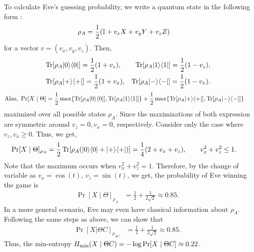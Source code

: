 To calculate Eve's guessing probability, we write a quantum state in the following form \cite{wilde2013quantum,nielsen2002quantum}:
\begin{align*}
    \rho_{A} 
    &= \frac{1}{2} (\mathbb{I} + v_{x} X + v_{y} Y + v_{z} Z)
\end{align*}
for a vector $v = (v_{x}, v_{y}, v_{z})$. Then,
\begin{align*}
    &\operatorname{Tr}[\rho_{A} |0 \rangle \langle 0|] 
    = \frac{1}{2} (1 + v_{z}), 
    &\operatorname{Tr}[\rho_{A} |1 \rangle \langle 1|] 
    = \frac{1}{2} (1 - v_{z}), \\
    &\operatorname{Tr}[\rho_{A} |+ \rangle \langle +|] 
    = \frac{1}{2} (1 + v_{x}), 
    &\operatorname{Tr}[\rho_{A} |- \rangle \langle -|] 
    = \frac{1}{2} (1 - v_{x}). 
\end{align*}
\begin{align*}
    \text{Also, } \Pr[X \mid \Theta] 
    &= \frac{1}{2} \max\{\operatorname{Tr}[\rho_{A} |0 \rangle \langle 0|], \operatorname{Tr}[\rho_{A} |1 \rangle \langle 1|]\} + 
    \frac{1}{2} \max\{\operatorname{Tr}[\rho_{A} |+ \rangle \langle +|], \operatorname{Tr}[\rho_{A} |- \rangle \langle -|]\}
\end{align*}
maximized over all possible states $\rho_{A}$. Since the maximizations of both expression are symmetric around $v_{z} = 0, v_{x} = 0$, respectively.  Consider only the case where $v_{z}, v_{x} \ge 0$. Thus, we get,
\begin{align*}
    \Pr[X \mid \Theta]_{\rho_{A}} 
    &= \frac{1}{2} \operatorname{Tr}[\rho_{A} (|0 \rangle \langle 0| + |+ \rangle \langle +|)] = \frac{1}{4} (2 + v_{x} + v_{z}), \qquad v_{x}^{2} + v_{z}^{2} \le 1.
\end{align*}
Note that the maximum occurs when $v_{x}^{2} + v_{z}^{2} = 1$. 
Therefore, by the change of variable as  $v_{x} = \cos(t)$, $v_{z} = \sin(t)$, we get,  the probability of Eve winning the game is 
\begin{align*}
    \Pr[X \mid \Theta]_{\rho_{A}} 
    &= \frac{1}{2} + \frac{1}{2 \sqrt{2}} 
    \approx 0.85.
\end{align*}
In a more general scenario, Eve may even have classical information about $\rho_{A}$. Following the same steps as above, we can show that 
\begin{align*}
    \Pr[X | \Theta C]_{\rho_{AC}} 
    &= \frac{1}{2} + \frac{1}{2 \sqrt{2}} 
    \approx 0.85.
\end{align*}
Thus, the min-entropy $H_{{\min}}(X \mid \Theta C) = - \log \Pr[X \mid \Theta C] \approx 0.22$. 

